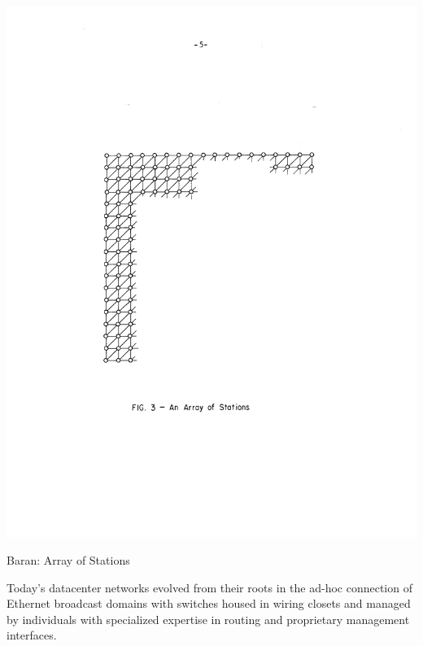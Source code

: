  
 \begin{marginfigure}
  \includegraphics[width=\linewidth]{../../FIGURES/Baran-stations.pdf}
  \caption{Baran: Array of Stations}
    \vspace{12pt}
\end{marginfigure}
 
 

Today's datacenter networks evolved from their roots in the ad-hoc connection of Ethernet broadcast domains with switches housed in wiring closets and managed by individuals with specialized expertise in routing and proprietary management interfaces.

